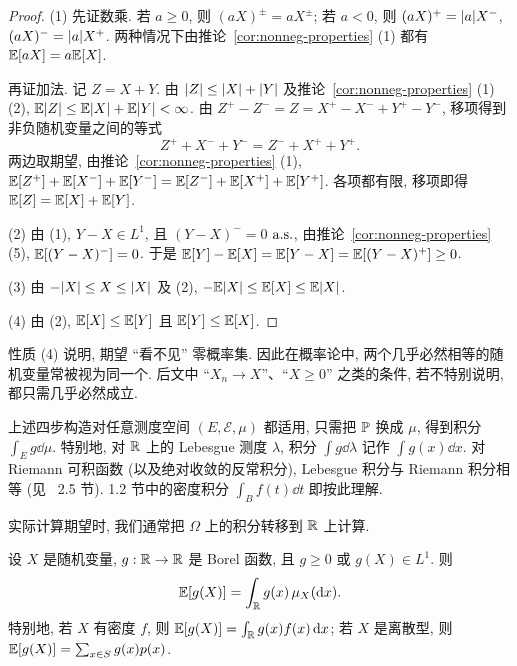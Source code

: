 \begin{proof}
(1) 先证数乘. 若 $a\ge0$, 则 $(aX)^\pm=aX^\pm$; 若 $a<0$, 则 $(aX)^+=\abs{a}X^-$, $(aX)^-=\abs{a}X^+$. 两种情况下由推论~\ref{cor:nonneg-properties} (1) 都有 $\E[aX]=a\E[X]$.

再证加法. 记 $Z=X+Y$. 由 $\abs{Z}\le\abs{X}+\abs{Y}$ 及推论~\ref{cor:nonneg-properties} (1)(2), $\E\abs{Z}\le\E\abs{X}+\E\abs{Y}<\infty$. 由
$Z^+-Z^-=Z=X^+-X^-+Y^+-Y^-$, 移项得到非负随机变量之间的等式
\[
Z^++X^-+Y^-=Z^-+X^++Y^+.
\]
两边取期望, 由推论~\ref{cor:nonneg-properties} (1),
$\E[Z^+]+\E[X^-]+\E[Y^-]=\E[Z^-]+\E[X^+]+\E[Y^+]$. 各项都有限, 移项即得 $\E[Z]=\E[X]+\E[Y]$.

(2) 由 (1), $Y-X\in L^1$, 且 $(Y-X)^-=0$ $\as$, 由推论~\ref{cor:nonneg-properties} (5), $\E[(Y-X)^-]=0$. 于是 $\E[Y]-\E[X]=\E[Y-X]=\E[(Y-X)^+]\ge0$.

(3) 由 $-\abs{X}\le X\le\abs{X}$ 及 (2), $-\E\abs{X}\le\E[X]\le\E\abs{X}$.

(4) 由 (2), $\E[X]\le\E[Y]$ 且 $\E[Y]\le\E[X]$.
\end{proof}

\begin{intuition}
性质 (4) 说明, 期望 ``看不见'' 零概率集. 因此在概率论中, 两个几乎必然相等的随机变量常被视为同一个. 后文中 ``$X_n\to X$''、``$X\ge0$'' 之类的条件, 若不特别说明, 都只需几乎必然成立.
\end{intuition}

\begin{remark}[一般测度下的积分]
上述四步构造对任意测度空间 $(E,\mathcal{E},\mu)$ 都适用, 只需把 $\P$ 换成 $\mu$, 得到积分 $\int_E g\dd\mu$. 特别地, 对 $\R$ 上的 Lebesgue 测度 $\lambda$, 积分 $\int g\dd\lambda$ 记作 $\int g(x)\dd x$. 对 Riemann 可积函数 (以及绝对收敛的反常积分), Lebesgue 积分与 Riemann 积分相等 (见~\cite{folland} 2.5 节). 1.2 节中的密度积分 $\int_B f(t)\dd t$ 即按此理解.
\end{remark}

实际计算期望时, 我们通常把 $\Omega$ 上的积分转移到 $\R$ 上计算.

\begin{theorem}[变量替换公式]\label{thm:change-of-variables}
设 $X$ 是随机变量, $g:\R\to\R$ 是 Borel 函数, 且 $g\ge0$ 或 $g(X)\in L^1$. 则
\[
\E[g(X)]=\int_{\R}g(x)\,\mu_X(\dd x).
\]
特别地, 若 $X$ 有密度 $f$, 则 $\E[g(X)]=\int_{\R}g(x)f(x)\dd x$; 若 $X$ 是离散型, 则 $\E[g(X)]=\sum_{x\in S}g(x)p(x)$.
\end{theorem}

